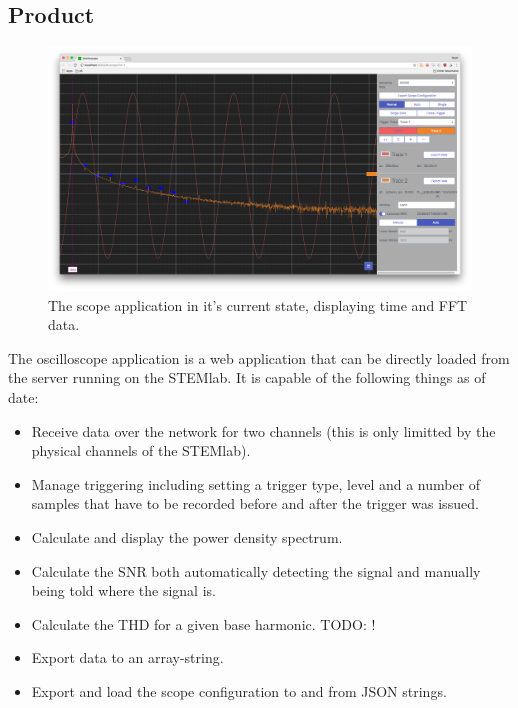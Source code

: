 \subsection{Product}
\label{sec:gui:product}

\begin{figure}
    \centering
    \includegraphics[width=1\textwidth]{images/gui/scope}
    \caption[The scope application]{%
        The scope application in it's current state, displaying time and FFT data.%
    }
    \label{fig:gui:structure}
\end{figure}

The oscilloscope application is a web application that can be directly loaded from the server running on the STEMlab.
It is capable of the following things as of date:

\begin{itemize}
    \item Receive data over the network for two channels (this is only limitted by the physical channels of the STEMlab).
    \item Manage triggering including setting a trigger type, level and a number of samples that have to be recorded before and after the trigger was issued.
    \item Calculate and display the power density spectrum.
    \item Calculate the SNR both automatically detecting the signal and manually being told where the signal is.
    \item Calculate the THD for a given base harmonic. TODO: !
    \item Export data to an array-string.
    \item Export and load the scope configuration to and from JSON strings.
\end{itemize}

